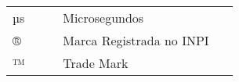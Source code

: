 

\begin{listasimb}

\begin{longtable}[l]{p{0.2\linewidth}p{0.7\linewidth}}
µs & Microsegundos\\
® & Marca Registrada no INPI\\
™ & Trade Mark\\
\end{longtable}

\end{listasimb}


